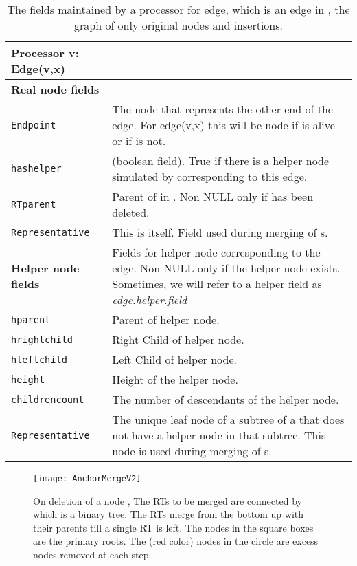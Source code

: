 \documentclass[11pt, letter]{article}
\begin{document}
\begin{table}[h!]
\begin{tabular}{|l|p{4.5in}|}
\hline 
\textbf{Processor v: Edge(v,x)}&\\ \cline{2-2}
\hline 
\textbf{Real node fields}&\\ \cline{2-2}
\hline
\texttt{Endpoint}& The node that represents the other end of the edge. For edge(v,x) this will be node  if  is
alive or  if  is not. \\
\texttt{hashelper}& (boolean field). True if there is a helper node simulated by  corresponding to this edge.\\
  \texttt{RTparent} & Parent of  in . Non NULL only if  has been deleted.\\
   \texttt{Representative}& This is  itself. Field used during merging of s. \\
\hline
\textbf{Helper node fields} & Fields for helper node corresponding to the edge. Non NULL only if the helper node exists.
Sometimes, we will refer to a helper field as \emph{edge.helper.field}\\
\cline{2-2}
\hline
 \texttt{hparent}& Parent of helper node. \\
 \texttt{hrightchild}& Right Child of helper node. \\
 \texttt{hleftchild}& Left Child of helper node. \\
 \texttt{height} &  Height of the helper node.\\
 \texttt{childrencount} & The number of descendants of the helper node.\\
 \texttt{Representative}& The unique leaf node of a subtree of a  that does not have a helper node in that
subtree. This node is used during merging of s.\\
\hline
\end{tabular}
\caption{The fields maintained by a processor  for edge, which is an edge in , the graph of only original nodes and  insertions.}
\label{tab: nodedata}
\end{table}


\begin{figure}[h!]
\centering
\texttt{[image: AnchorMergeV2]}
\caption{On deletion of a node , The RTs to be merged are connected by   which is a binary tree. The RTs merge
from the bottom up with their parents till a single RT is left. The nodes in the square boxes are the primary roots. The (red
color) nodes in the circle are excess nodes removed at each step.}
\label{fig: Anchormerge}
\end{figure}
\end{document}
